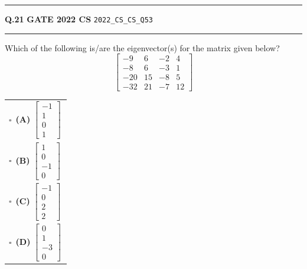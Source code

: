 \documentclass[a4paper,10pt]{article}
\begin{document}
\vspace{6pt}\hrule height 0.35pt\vspace{6pt}
\noindent
\begin{tcolorbox}[
    blanker,
    sidebyside,
    sidebyside align=top,
    lefthand width=0.55\textwidth,
    top=4pt, bottom=4pt, left=0pt, right=0pt,
    middle=16pt,
    underlay={
        \draw[dashed, black!80, line width=0.8pt, dash pattern=on 4pt off 3pt]
            ([xshift=0.55\textwidth+8pt]frame.north west) --
            ([xshift=0.55\textwidth+8pt]frame.south west);
    }
]
\textbf{Q.21}  \hfill {\footnotesize\textbf{GATE 2022 CS} \quad \tiny\texttt{2022\_CS\_CS\_Q53}}
\vspace{2pt}\hrule height 0.3pt\vspace{4pt}

Which of the following is/are the eigenvector(s) for the matrix given below?
\[ \begin{bmatrix} -9 & 6 & -2 & 4 \\ -8 & 6 & -3 & 1 \\ -20 & 15 & -8 & 5 \\ -32 & 21 & -7 & 12 \end{bmatrix} \]

\par\vspace{6pt}\noindent
\begin{tabular}{@{}p{0.98\linewidth}@{}}
$\square$\ \textbf{(A)} $\begin{bmatrix} -1 \\ 1 \\ 0 \\ 1 \end{bmatrix}$ \\
\addlinespace[3pt]
$\square$\ \textbf{(B)} $\begin{bmatrix} 1 \\ 0 \\ -1 \\ 0 \end{bmatrix}$ \\
\addlinespace[3pt]
$\square$\ \textbf{(C)} $\begin{bmatrix} -1 \\ 0 \\ 2 \\ 2 \end{bmatrix}$ \\
\addlinespace[3pt]
$\square$\ \textbf{(D)} $\begin{bmatrix} 0 \\ 1 \\ -3 \\ 0 \end{bmatrix}$
\end{tabular}


\end{tcolorbox}
\end{document}
